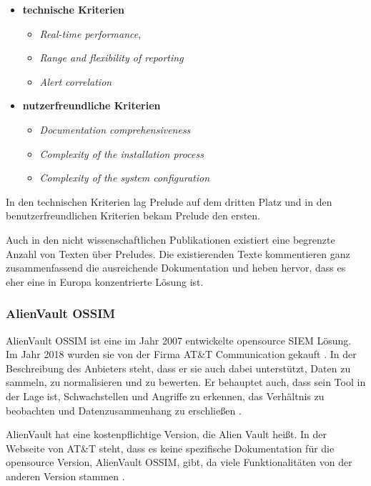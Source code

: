 \begin{itemize}[noitemsep]
   \item \textbf{technische Kriterien}
   \begin{itemize}[noitemsep]
      \item \textit{Real-time performance}, 
      \item \textit{Range and flexibility of reporting}
      \item \textit{Alert correlation}
   \end{itemize}

   \item \textbf{nutzerfreundliche Kriterien}
   \begin{itemize}[noitemsep]
      \item \textit{Documentation comprehensiveness}
      \item \textit{Complexity of the installation process}
      \item \textit{Complexity of the system configuration}
   \end{itemize}
\end{itemize}

In den technischen Kriterien lag Prelude auf dem dritten Platz und in den benutzerfreundlichen Kriterien bekam Prelude den ersten. 

Auch in den nicht wissenschaftlichen Publikationen existiert eine begrenzte Anzahl von Texten über Preludes. Die existierenden Texte kommentieren ganz zusammenfassend die ausreichende Dokumentation und heben hervor, dass es eher eine in Europa konzentrierte Lösung ist.

\subsubsection{AlienVault OSSIM}
AlienVault OSSIM ist eine im Jahr 2007 entwickelte \gls{opensource} \gls{SIEM} Lösung. Im Jahr 2018 wurden sie von der Firma AT\&T Communication gekauft  \citep{CBN_AV}. In der Beschreibung des Anbieters steht, dass er sie auch dabei unterstützt, Daten zu sammeln, zu normalisieren und zu bewerten. Er behauptet auch, dass sein Tool in der Lage ist, Schwachstellen und Angriffe zu erkennen, das Verhältnis zu beobachten und Datenzusammenhang zu erschließen \citep{ATT_AVO}. 

AlienVault hat eine kostenpflichtige Version, die Alien Vault  heißt. In der Webseite von AT\&T steht, dass es keine spezifische Dokumentation für die \gls{opensource} Version, AlienVault OSSIM, gibt, da viele Funktionalitäten von der anderen Version stammen \citep{ATT_AVO}. 

